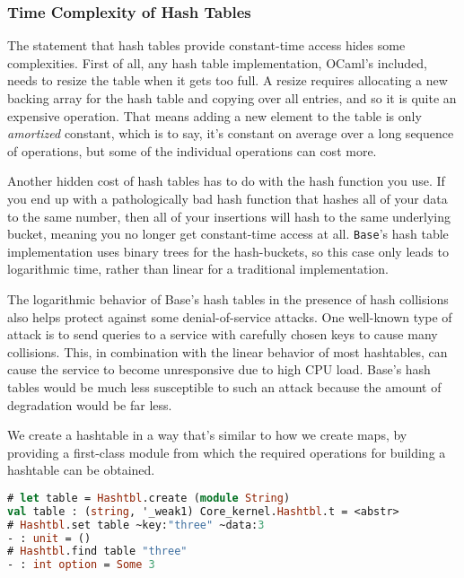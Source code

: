 \hypertarget{time-complexity-of-hash-tables}{%
\subsubsection{Time Complexity of Hash
Tables}\label{time-complexity-of-hash-tables}}

The statement that hash tables provide constant-time access hides some
complexities. First of all, any hash table implementation, OCaml's
included, needs to resize the table when it gets too full. A resize
requires allocating a new backing array for the hash table and copying
over all entries, and so it is quite an expensive operation. That means
adding a new element to the table is only \emph{amortized} constant,
which is to say, it's constant on average over a long sequence of
operations, but some of the individual operations can cost more.

Another hidden cost of hash tables has to do with the hash function you
use. If you end up with a pathologically bad hash function that hashes
all of your data to the same number, then all of your insertions will
hash to the same underlying bucket, meaning you no longer get
constant-time access at all. \passthrough{\lstinline!Base!}'s hash table
implementation uses binary trees for the hash-buckets, so this case only
leads to logarithmic time, rather than linear for a traditional
implementation.

The logarithmic behavior of Base's hash tables in the presence of hash
collisions also helps protect against some denial-of-service attacks.
One well-known type of attack is to send queries to a service with
carefully chosen keys to cause many collisions. This, in combination
with the linear behavior of most hashtables, can cause the service to
become unresponsive due to high CPU load. Base's hash tables would be
much less susceptible to such an attack because the amount of
degradation would be far less. 

We create a hashtable in a way that's similar to how we create maps, by
providing a first-class module from which the required operations for
building a hashtable can be obtained.

\begin{lstlisting}[language=Caml]
# let table = Hashtbl.create (module String)
val table : (string, '_weak1) Core_kernel.Hashtbl.t = <abstr>
# Hashtbl.set table ~key:"three" ~data:3
- : unit = ()
# Hashtbl.find table "three"
- : int option = Some 3
\end{lstlisting}

